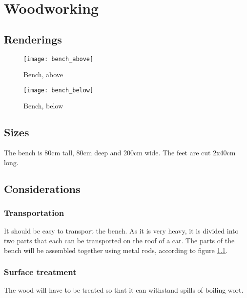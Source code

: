 \documentclass[11pt,fleqn,openany]{book} %
\begin{document}


\chapter{Woodworking}

\section{Renderings}

\begin{figure}[h]
\centering\texttt{[image: bench\_above]}
\caption{Bench, above}
\label{bench_above}
\end{figure}

\begin{figure}[h]
\centering\texttt{[image: bench\_below]}
\caption{Bench, below}
\end{figure}

\section{Sizes}

The bench is 80cm tall, 80cm deep and 200cm wide. The feet are cut 2x40cm long.

\section{Considerations}

\subsection{Transportation}

It should be easy to transport the bench. As it is very heavy, it is divided into two parts that each can be transported on the roof of a car. The parts of the bench will be assembled together using metal rods, according to figure \ref{bench_above}.

\subsection{Surface treatment}

The wood will have to be treated so that it can withstand spills of boiling wort.

\end{document}

